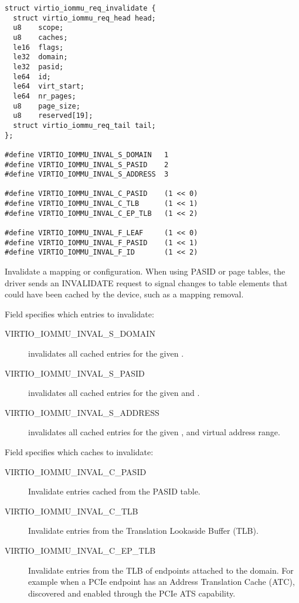 \begin{lstlisting}
struct virtio_iommu_req_invalidate {
  struct virtio_iommu_req_head head;
  u8    scope;
  u8    caches;
  le16  flags;
  le32  domain;
  le32  pasid;
  le64  id;
  le64  virt_start;
  le64  nr_pages;
  u8    page_size;
  u8    reserved[19];
  struct virtio_iommu_req_tail tail;
};

#define VIRTIO_IOMMU_INVAL_S_DOMAIN   1
#define VIRTIO_IOMMU_INVAL_S_PASID    2
#define VIRTIO_IOMMU_INVAL_S_ADDRESS  3

#define VIRTIO_IOMMU_INVAL_C_PASID    (1 << 0)
#define VIRTIO_IOMMU_INVAL_C_TLB      (1 << 1)
#define VIRTIO_IOMMU_INVAL_C_EP_TLB   (1 << 2)

#define VIRTIO_IOMMU_INVAL_F_LEAF     (1 << 0)
#define VIRTIO_IOMMU_INVAL_F_PASID    (1 << 1)
#define VIRTIO_IOMMU_INVAL_F_ID       (1 << 2)

\end{lstlisting}

Invalidate a mapping or configuration. When using PASID or page
tables, the driver sends an INVALIDATE request to signal changes
to table elements that could have been cached by the device, such
as a mapping removal.

Field  specifies which entries to invalidate:
\begin{description}
  \item[VIRTIO_IOMMU_INVAL_S_DOMAIN] invalidates all cached
    entries for the given .
  \item[VIRTIO_IOMMU_INVAL_S_PASID] invalidates all cached
    entries for the given  and .
  \item[VIRTIO_IOMMU_INVAL_S_ADDRESS] invalidates all cached
    entries for the given ,  and
    virtual address range.
\end{description}

Field  specifies which caches to invalidate:
\begin{description}
  \item[VIRTIO_IOMMU_INVAL_C_PASID] Invalidate entries cached
    from the PASID table.
  \item[VIRTIO_IOMMU_INVAL_C_TLB] Invalidate entries from the
    Translation Lookaside Buffer (TLB).
  \item[VIRTIO_IOMMU_INVAL_C_EP_TLB] Invalidate entries from the
    TLB of endpoints attached to the domain. For example when a
    PCIe endpoint has an Address Translation Cache (ATC),
    discovered and enabled through the PCIe ATS capability.
\end{description}

